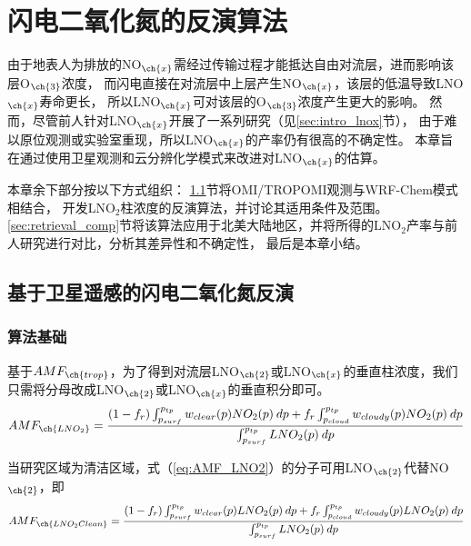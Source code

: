 
\chapter{闪电二氧化氮的反演算法} \label{sec:retrieval}

由于地表人为排放的NO$_{\ch{x}}$需经过传输过程才能抵达自由对流层，进而影响该层O$_{\ch{3}}$浓度，
而闪电直接在对流层中上层产生NO$_{\ch{x}}$，该层的低温导致LNO$_{\ch{x}}$寿命更长，
所以LNO$_{\ch{x}}$可对该层的O$_{\ch{3}}$浓度产生更大的影响。
然而，尽管前人针对LNO$_{\ch{x}}$开展了一系列研究（见\ref{sec:intro_lnox}节），
由于难以原位观测或实验室重现，所以LNO$_{\ch{x}}$的产率仍有很高的不确定性。
本章旨在通过使用卫星观测和云分辨化学模式来改进对LNO$_{\ch{x}}$的估算。

本章余下部分按以下方式组织：
\ref{sec:retrieval_method}节将OMI/TROPOMI观测与WRF-Chem模式相结合，
开发LNO$_2$柱浓度的反演算法，并讨论其适用条件及范围。
\ref{sec:retrieval_comp}节将该算法应用于北美大陆地区，并将所得的LNO$_2$产率与前人研究进行对比，分析其差异性和不确定性，
最后是本章小结。

\section{基于卫星遥感的闪电二氧化氮反演} \label{sec:retrieval_method}

\subsection{算法基础} \label{sec:amf_definition}

基于$AMF_{\ch{trop}}$，为了得到对流层LNO$_{\ch{2}}$或LNO$_{\ch{x}}$的垂直柱浓度，我们只需将分母改成LNO$_{\ch{2}}$或LNO$_{\ch{x}}$的垂直积分即可。
\begin{equation} \label{eq:AMF_LNO2}
AMF_{\ch{LNO_2}} = \frac{(1-f_r) \int_{p_{surf}}^{p_{tp}} w_{clear}(p) NO_2(p) \: dp + f_r \int_{p_{cloud}}^{p_{tp}} w_{cloudy}(p) NO_2(p) \: dp}{\int_{p_{surf}}^{p_{tp}} LNO_2(p) \: dp}
\end{equation}

当研究区域为清洁区域，式（\ref{eq:AMF_LNO2}）的分子可用LNO$_{\ch{2}}$代替NO$_{\ch{2}}$，即
\begin{equation} \label{eq:AMF_LNO2clean}
AMF_{\ch{LNO_2Clean}} = \frac{(1-f_r) \int_{p_{surf}}^{p_{tp}} w_{clear}(p) LNO_2(p) \: dp + f_r \int_{p_{cloud}}^{p_{tp}} w_{cloudy}(p) LNO_2(p) \: dp}{\int_{p_{surf}}^{p_{tp}} LNO_2(p) \: dp}
\end{equation}

